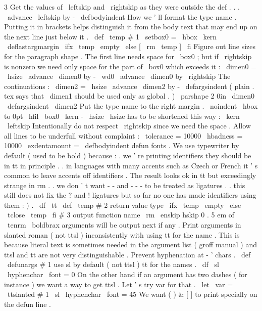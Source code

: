 {{3
{
%
%
Get
the
values
of
\
leftskip
and
\
rightskip
as
they
were
outside
the
def
.
.
.
\
advance
\
leftskip
by
-
\
defbodyindent
%
%
How
we
'
ll
format
the
type
name
.
Putting
it
in
brackets
helps
%
distinguish
it
from
the
body
text
that
may
end
up
on
the
next
line
%
just
below
it
.
\
def
\
temp
{
#
1
}
%
\
setbox0
=
\
hbox
{
\
kern
\
deflastargmargin
\
ifx
\
temp
\
empty
\
else
[
\
rm
\
temp
]
\
fi
}
%
%
Figure
out
line
sizes
for
the
paragraph
shape
.
%
The
first
line
needs
space
for
\
box0
;
but
if
\
rightskip
is
nonzero
%
we
need
only
space
for
the
part
of
\
box0
which
exceeds
it
:
\
dimen0
=
\
hsize
\
advance
\
dimen0
by
-
\
wd0
\
advance
\
dimen0
by
\
rightskip
%
The
continuations
:
\
dimen2
=
\
hsize
\
advance
\
dimen2
by
-
\
defargsindent
%
(
plain
.
tex
says
that
\
dimen1
should
be
used
only
as
global
.
)
\
parshape
2
0in
\
dimen0
\
defargsindent
\
dimen2
%
%
Put
the
type
name
to
the
right
margin
.
\
noindent
\
hbox
to
0pt
{
%
\
hfil
\
box0
\
kern
-
\
hsize
%
\
hsize
has
to
be
shortened
this
way
:
\
kern
\
leftskip
%
Intentionally
do
not
respect
\
rightskip
since
we
need
the
space
.
}
%
%
%
Allow
all
lines
to
be
underfull
without
complaint
:
\
tolerance
=
10000
\
hbadness
=
10000
\
exdentamount
=
\
defbodyindent
{
%
%
defun
fonts
.
We
use
typewriter
by
default
(
used
to
be
bold
)
because
:
%
.
we
'
re
printing
identifiers
they
should
be
in
tt
in
principle
.
%
.
in
languages
with
many
accents
such
as
Czech
or
French
it
'
s
%
common
to
leave
accents
off
identifiers
.
The
result
looks
ok
in
%
tt
but
exceedingly
strange
in
rm
.
%
.
we
don
'
t
want
-
-
and
-
-
-
to
be
treated
as
ligatures
.
%
.
this
still
does
not
fix
the
?
and
!
ligatures
but
so
far
no
%
one
has
made
identifiers
using
them
:
)
.
\
df
\
tt
\
def
\
temp
{
#
2
}
%
return
value
type
\
ifx
\
temp
\
empty
\
else
\
tclose
{
\
temp
}
\
fi
#
3
%
output
function
name
}
%
{
\
rm
\
enskip
}
%
hskip
0
.
5
em
of
\
tenrm
%
\
boldbrax
%
arguments
will
be
output
next
if
any
.
}
%
Print
arguments
in
slanted
roman
(
not
ttsl
)
inconsistently
with
using
%
tt
for
the
name
.
This
is
because
literal
text
is
sometimes
needed
in
%
the
argument
list
(
groff
manual
)
and
ttsl
and
tt
are
not
very
%
distinguishable
.
Prevent
hyphenation
at
-
'
chars
.
%
\
def
\
defunargs
#
1
{
%
%
use
sl
by
default
(
not
ttsl
)
%
tt
for
the
names
.
\
df
\
sl
\
hyphenchar
\
font
=
0
%
%
On
the
other
hand
if
an
argument
has
two
dashes
(
for
instance
)
we
%
want
a
way
to
get
ttsl
.
Let
'
s
try
var
for
that
.
\
let
\
var
=
\
ttslanted
#
1
%
\
sl
\
hyphenchar
\
font
=
45
}
%
We
want
(
)
&
[
]
to
print
specially
on
the
defun
line
.
%
}}
